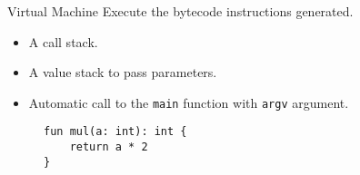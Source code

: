 \begin{slide}
    \begin{block}{Virtual Machine}
        Execute the bytecode instructions generated.
    \end{block}
    \vfill
    \begin{itemize}
        \item A call stack.
        \item A value stack to pass parameters.
        \item Automatic call to the \texttt{main} function with \texttt{argv} argument.
    \end{itemize}
\end{slide}
\begin{slide}
    \begin{figure}[H]
        \centering
        \begin{subtable}{0.5\textwidth}
            \begin{verbatim}
fun mul(a: int): int {
    return a * 2
}


\end{verbatim}
\end{subtable}
\end{figure}
\end{slide}
